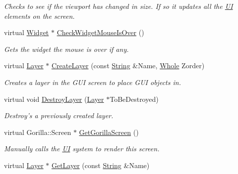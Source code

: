 \begin{DoxyCompactItemize}
\begin{DoxyCompactList}\small\item\em Checks to see if the viewport has changed in size. If so it updates all the \hyperlink{namespaceMezzanine_1_1UI}{UI} elements on the screen. \item\end{DoxyCompactList}\item 
virtual \hyperlink{classMezzanine_1_1UI_1_1Widget}{Widget} $\ast$ \hyperlink{classMezzanine_1_1UI_1_1Screen_aba94ad01214919f9a7506bdef39aee64}{CheckWidgetMouseIsOver} ()
\begin{DoxyCompactList}\small\item\em Gets the widget the mouse is over if any. \item\end{DoxyCompactList}\item 
virtual \hyperlink{classMezzanine_1_1UI_1_1Layer}{Layer} $\ast$ \hyperlink{classMezzanine_1_1UI_1_1Screen_a4c7471ee8b43649a5eab8c43e28f31b7}{CreateLayer} (const \hyperlink{namespaceMezzanine_acf9fcc130e6ebf08e3d8491aebcf1c86}{String} \&Name, \hyperlink{namespaceMezzanine_adcbb6ce6d1eb4379d109e51171e2e493}{Whole} Zorder)
\begin{DoxyCompactList}\small\item\em Creates a layer in the GUI screen to place GUI objects in. \item\end{DoxyCompactList}\item 
virtual void \hyperlink{classMezzanine_1_1UI_1_1Screen_a7f81a6d97593c7c152d543e499f3b2a1}{DestroyLayer} (\hyperlink{classMezzanine_1_1UI_1_1Layer}{Layer} $\ast$ToBeDestroyed)
\begin{DoxyCompactList}\small\item\em Destroy's a previously created layer. \item\end{DoxyCompactList}\item 
virtual Gorilla::Screen $\ast$ \hyperlink{classMezzanine_1_1UI_1_1Screen_abd6f36565db2aaf29a46180fcfe0bef2}{GetGorillaScreen} ()
\begin{DoxyCompactList}\small\item\em Manually calls the \hyperlink{namespaceMezzanine_1_1UI}{UI} system to render this screen. \item\end{DoxyCompactList}\item 
virtual \hyperlink{classMezzanine_1_1UI_1_1Layer}{Layer} $\ast$ \hyperlink{classMezzanine_1_1UI_1_1Screen_ac61f47f88af6f4ee6a4f0b705c37647b}{GetLayer} (const \hyperlink{namespaceMezzanine_acf9fcc130e6ebf08e3d8491aebcf1c86}{String} \&Name)

\end{DoxyCompactItemize}
